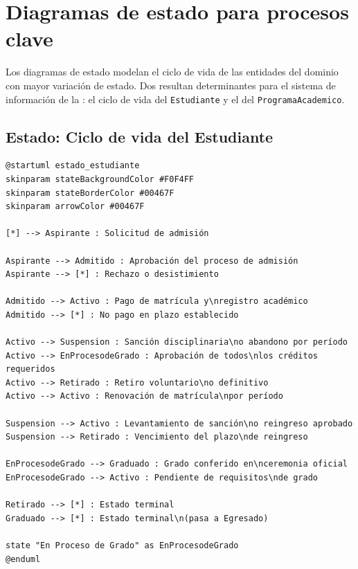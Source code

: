 \section{Diagramas de estado para procesos clave}
\label{sec:estados}

Los diagramas de estado modelan el ciclo de vida de las entidades del
dominio con mayor variación de estado. Dos resultan determinantes para
el sistema de información de la \ud: el ciclo de vida del
\texttt{Estudiante} y el del \texttt{ProgramaAcademico}.

\subsection*{Estado: Ciclo de vida del Estudiante}

\begin{lstlisting}[style=plantumlStyle,
  caption={Diagrama de estado: ciclo de vida del \texttt{Estudiante}
    (PlantUML).},
  label={lst:plantuml-estado-estudiante}]
@startuml estado_estudiante
skinparam stateBackgroundColor #F0F4FF
skinparam stateBorderColor #00467F
skinparam arrowColor #00467F

[*] --> Aspirante : Solicitud de admisión

Aspirante --> Admitido : Aprobación del proceso de admisión
Aspirante --> [*] : Rechazo o desistimiento

Admitido --> Activo : Pago de matrícula y\nregistro académico
Admitido --> [*] : No pago en plazo establecido

Activo --> Suspension : Sanción disciplinaria\no abandono por período
Activo --> EnProcesodeGrado : Aprobación de todos\nlos créditos requeridos
Activo --> Retirado : Retiro voluntario\no definitivo
Activo --> Activo : Renovación de matrícula\npor período

Suspension --> Activo : Levantamiento de sanción\no reingreso aprobado
Suspension --> Retirado : Vencimiento del plazo\nde reingreso

EnProcesodeGrado --> Graduado : Grado conferido en\nceremonia oficial
EnProcesodeGrado --> Activo : Pendiente de requisitos\nde grado

Retirado --> [*] : Estado terminal
Graduado --> [*] : Estado terminal\n(pasa a Egresado)

state "En Proceso de Grado" as EnProcesodeGrado
@enduml
\end{lstlisting}

